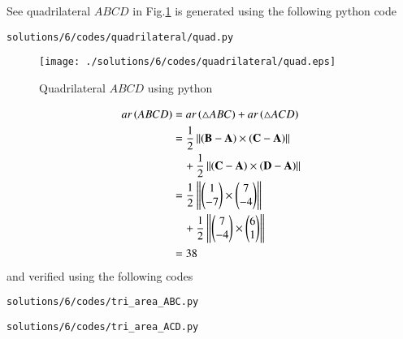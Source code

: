See quadrilateral $ABCD$ in Fig.\ref{fig:2.2.6_quad_1} is generated using the following python code 
\begin{lstlisting}
solutions/6/codes/quadrilateral/quad.py
\end{lstlisting}
\begin{figure}[!ht]
\centering
\texttt{[image: ./solutions/6/codes/quadrilateral/quad.eps]}
\caption{Quadrilateral $ABCD$ using python}
\label{fig:2.2.6_quad_1}
\end{figure} 
%
\begin{align}
ar\brak{ABCD} &= ar\brak{\triangle ABC} + ar\brak{\triangle {ACD}}
\\
&=\frac{1}{2}\norm{(\vec{B}-\vec{A})\times(\vec{C}-\vec{A})}
\\
&\quad +\frac{1}{2}\norm{(\vec{C}-\vec{A})\times(\vec{D}-\vec{A})}
%
\\
&=\frac{1}{2}\norm{\myvec{1\\-7} \times \myvec{7\\-4}} 
\\
&\quad +\frac{1}{2}\norm{\myvec{7\\-4} \times \myvec{6\\1}} 
\\
&= 38
\end{align}
and verified using the following codes
\begin{lstlisting}
solutions/6/codes/tri_area_ABC.py
\end{lstlisting} 
\begin{lstlisting}
solutions/6/codes/tri_area_ACD.py
\end{lstlisting} 

